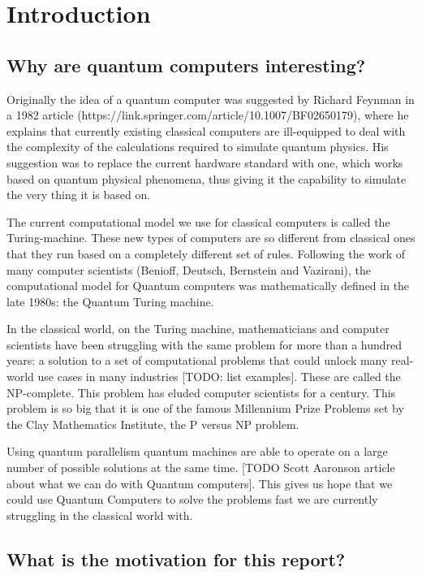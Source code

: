 \chapter{Introduction}

\section{Why are quantum computers interesting?}

Originally the idea of a quantum computer was suggested by Richard Feynman in a 1982 article (https://link.springer.com/article/10.1007/BF02650179), where he explains that currently existing classical computers are ill-equipped to deal with the complexity of the calculations required to simulate quantum physics. His suggestion was to replace the current hardware standard with one, which works based on quantum physical phenomena, thus giving it the capability to simulate the very thing it is based on.

The current computational model we use for classical computers is called the Turing-machine. These new types of computers are so different from classical ones that they run based on a completely different set of rules. Following the work of many computer scientists (Benioff, Deutsch, Bernstein and Vazirani), the computational model for Quantum computers was mathematically defined in the late 1980s: the Quantum Turing machine.

In the classical world, on the Turing machine, mathematicians and computer scientists have been struggling with the same problem for more than a hundred years: a solution to a set of computational problems that could unlock many real-world use cases in many industries [TODO: list examples]. These are called the NP-complete. This problem has eluded computer scientists for a century. This problem is so big that it is one of the famous Millennium Prize Problems set by the Clay Mathematics Institute, the P versus NP problem.

Using quantum parallelism quantum machines are able to operate on a large number of possible solutions at the same time. [TODO Scott Aaronson article about what we can do with Quantum computers]. This gives us hope that we could use Quantum Computers to solve the problems fast we are currently struggling in the classical world with.

\section{What is the motivation for this report?}


